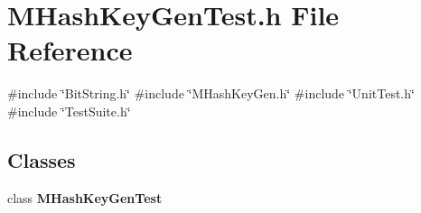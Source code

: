 \section{M\+Hash\+Key\+Gen\+Test.\+h File Reference}
\label{MHashKeyGenTest_8h}
{\ttfamily \#include \char`\"{}Bit\+String.\+h\char`\"{}}\newline
{\ttfamily \#include \char`\"{}M\+Hash\+Key\+Gen.\+h\char`\"{}}\newline
{\ttfamily \#include \char`\"{}Unit\+Test.\+h\char`\"{}}\newline
{\ttfamily \#include \char`\"{}Test\+Suite.\+h\char`\"{}}\newline
\subsection*{Classes}
\begin{DoxyCompactItemize}
\item 
class \textbf{ M\+Hash\+Key\+Gen\+Test}
\end{DoxyCompactItemize}
